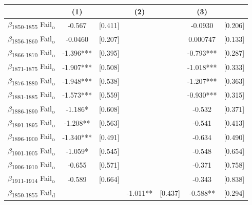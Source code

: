 {
\def\sym#1{\ifmmode^{#1}\else\(^{#1}\)\fi}
\begin{tabular}{l*{3}{cc}}
\toprule
            &\multicolumn{1}{c}{(1)}   &            &\multicolumn{1}{c}{(2)}   &            &\multicolumn{1}{c}{(3)}   &            \\
\midrule
$\beta$\textsubscript{1850-1855} Fail\textsubscript{o}&      -0.567   &     [0.411]&               &            &     -0.0930   &     [0.206]\\
$\beta$\textsubscript{1856-1860} Fail\textsubscript{o}&     -0.0460   &     [0.207]&               &            &    0.000747   &     [0.133]\\
$\beta$\textsubscript{1866-1870} Fail\textsubscript{o}&      -1.396***&     [0.395]&               &            &      -0.793***&     [0.287]\\
$\beta$\textsubscript{1871-1875} Fail\textsubscript{o}&      -1.907***&     [0.508]&               &            &      -1.018***&     [0.333]\\
$\beta$\textsubscript{1876-1880} Fail\textsubscript{o}&      -1.948***&     [0.538]&               &            &      -1.207***&     [0.363]\\
$\beta$\textsubscript{1881-1885} Fail\textsubscript{o}&      -1.573***&     [0.559]&               &            &      -0.930***&     [0.315]\\
$\beta$\textsubscript{1886-1890} Fail\textsubscript{o}&      -1.186*  &     [0.608]&               &            &      -0.532   &     [0.371]\\
$\beta$\textsubscript{1891-1895} Fail\textsubscript{o}&      -1.208** &     [0.563]&               &            &      -0.541   &     [0.413]\\
$\beta$\textsubscript{1896-1900} Fail\textsubscript{o}&      -1.340***&     [0.491]&               &            &      -0.634   &     [0.490]\\
$\beta$\textsubscript{1901-1905} Fail\textsubscript{o}&      -1.059*  &     [0.545]&               &            &      -0.548   &     [0.654]\\
$\beta$\textsubscript{1906-1910} Fail\textsubscript{o}&      -0.655   &     [0.571]&               &            &      -0.371   &     [0.758]\\
$\beta$\textsubscript{1911-1914} Fail\textsubscript{o}&      -0.589   &     [0.664]&               &            &      -0.343   &     [0.838]\\
$\beta$\textsubscript{1850-1855} Fail\textsubscript{d}&               &            &      -1.011** &     [0.437]&      -0.588** &     [0.294]\\

\end{tabular}}
